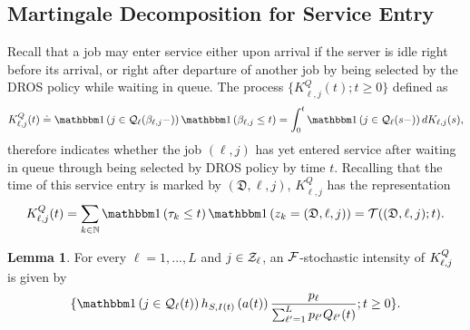 \documentclass{article}
\theoremstyle{definition}
\newtheorem{lemma}[theorem]{Lemma}
\numberwithin{equation}{section}
\begin{document}
\subsection{Martingale Decomposition for Service Entry}

Recall that a job may enter service either upon arrival if the server is idle right before its arrival, or right after departure of another job by being selected by the DROS policy while waiting in queue. The process $\{K^Q_{\ell,j}(t);t\geq0\}$ defined as
\begin{equation}\label{def_KQ}
\entry^{Q}_{\ell,j}(t)\doteq \indic{j\in\inque_\ell(\entrytime_{\ell,j}-)}\indic{\entrytime_{\ell,j}\leq t} = \int_0^t \indic{j\in\inque_\ell(s-)}d\entry_{\ell,j}(s),
\end{equation}
therefore indicates whether the job $(\ell,j)$ has yet entered service after waiting in queue through being selected by DROS policy by time $t$. Recalling that the time of this service entry is marked by $(\mathfrak{D},\ell,j)$, $K^Q_{\ell,j}$ has the representation
\begin{align}\label{Kl_marked}
  \entry_{\ell,j}^Q(t) = \sum_{k\in\N}\indic{\tau_k\leq t}\indic{z_k=(\mathfrak{D},\ell,j)} =  \mathcal{T}((\mathfrak{D},\ell,j);t).
\end{align}



\begin{lemma}\label{lem_Kintensity}
  For every $\ell=1,...,L$ and $j\in\mathcal{Z}_\ell$, an $\mathcal{F}$-stochastic intensity of $K^Q_{\ell,j}$ is given by
  \begin{equation}\label{Klj_decomposition}
    \{\indic{j\in\inque_\ell(t)} h_{S,\class(t)}\left(\age(t)\right) \frac{\weight_\ell}{\sum_{\ell'=1}^L\weight_{\ell'}\ql_{\ell'}(t)};t\geq0\}.
  \end{equation}
\end{lemma}
\end{document}
